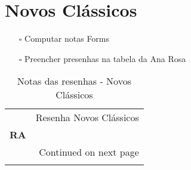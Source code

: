 \documentclass[11pt]{article}
\begin{document}
\section{Novos Clássicos}
\label{sec:org6e19a0e}

\begin{itemize}
\item[{$\square$}] Computar notas Forms
\item[{$\square$}] Preencher presenhas na tabela da Ana Rosa
\end{itemize}
\begin{center}
\begin{longtable}{lr}
\caption{Notas das resenhas - Novos Clássicos}\\
\toprule
{} &  Resenha Novos Clássicos \\
\textbf{RA    } &                          \\
\midrule
\endhead
\midrule
\multicolumn{2}{r}{{Continued on next page}} \\
\midrule
\endfoot


\end{longtable}
\end{center}
\end{document}
